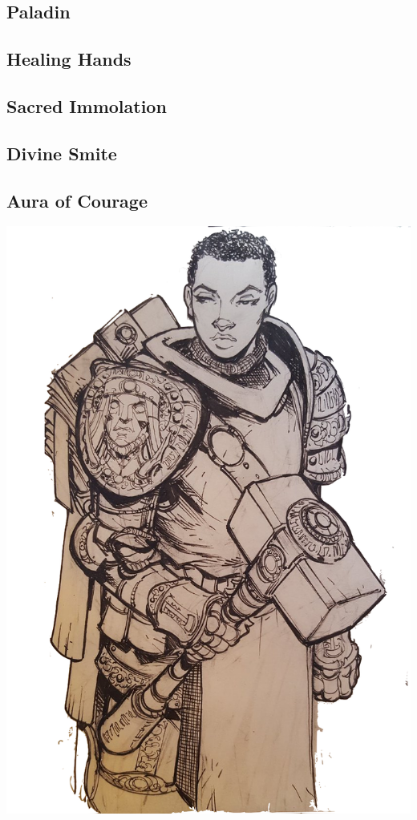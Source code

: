 
\begin{multicols*}{2}

\section{Paladin}

\subsection*{Healing Hands}

\subsection*{Sacred Immolation}

\subsection*{Divine Smite}

\subsection*{Aura of Courage}

\begin{Figure}
\centering
\includegraphics[width=\textwidth]{img/paladin-2.png}
\end{Figure}
    
\end{multicols*}

    